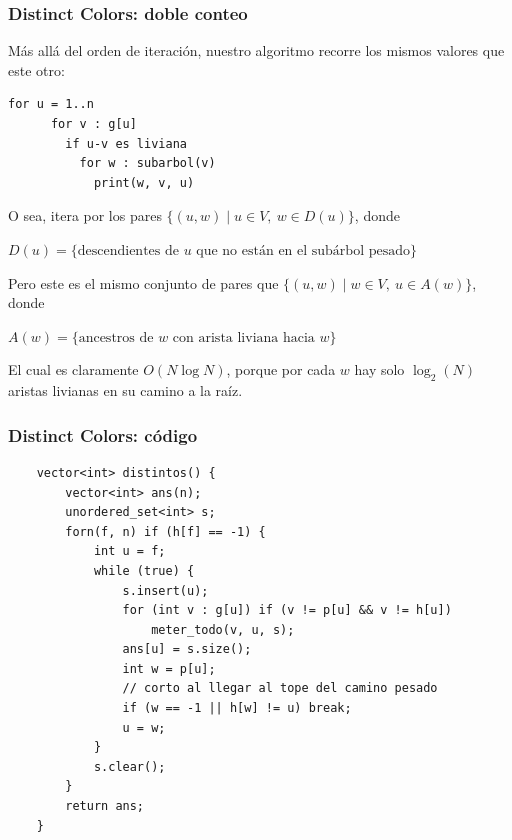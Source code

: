 \begin{frame}[fragile]
  \frametitle{Distinct Colors: doble conteo}

Más allá del orden de iteración, nuestro algoritmo recorre los mismos valores que este otro:

\begin{lstlisting}[language={},basicstyle=\ttfamily\small]
    for u = 1..n
      for v : g[u]
        if u-v es liviana
          for w : subarbol(v)
            print(w, v, u)
\end{lstlisting}

O sea, itera por los pares \(\{(u, w) \mid u \in V,\ w \in D(u)\}\), donde

\centerline{$\displaystyle
  D(u) = \{ \text{descendientes de } u \text{ que no están en el subárbol pesado} \}
$}

\smallskip

Pero este es el mismo conjunto de pares que \(\{(u, w) \mid w \in V,\ u \in A(w)\}\), donde

\centerline{$\displaystyle
  A(w) = \{ \text{ancestros de } w \text{ con arista liviana hacia } w \}
$}

El cual es claramente \(O(N \log N)\), porque por cada \(w\) hay solo \(\log_2(N)\) aristas livianas en su camino a la raíz.

\end{frame}

\begin{frame}[fragile]
  \frametitle{Distinct Colors: código}

\begin{lstlisting}
    vector<int> distintos() {
        vector<int> ans(n);
        unordered_set<int> s;
        forn(f, n) if (h[f] == -1) {
            int u = f;
            while (true) {
                s.insert(u);
                for (int v : g[u]) if (v != p[u] && v != h[u])
                    meter_todo(v, u, s);
                ans[u] = s.size();
                int w = p[u];
                // corto al llegar al tope del camino pesado
                if (w == -1 || h[w] != u) break;
                u = w;
            }
            s.clear();
        }
        return ans;
    }
\end{lstlisting}
\end{frame}
